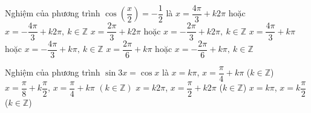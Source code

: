 \begin{ex}%
	Nghiệm của phương  trình $\cos \left(\dfrac{x}{2}\right)= -\dfrac{1}{2}$ là
	\choice 
		{\True $x=\dfrac{4\pi}{3}+k2\pi$ hoặc $x=-\dfrac{4\pi}{3} +  k2\pi, \ k\in \mathbb{Z}$}
		{$x=\dfrac{2\pi}{3}  + k2\pi$ hoặc $x=-\dfrac{2\pi}{3} + k2\pi, \ k\in \mathbb{Z}$}
		{$x=\dfrac{4\pi}{3} + k\pi$ hoặc $x=-\dfrac{4\pi}{3} + k\pi, \ k\in \mathbb{Z}$} 
		{$x=\dfrac{2\pi}{6} + k\pi$ hoặc $x=-\dfrac{2\pi}{6} + k\pi, \ k\in  \mathbb{Z}$}
\end{ex}

\begin{ex}%
	Nghiệm của phương trình $\sin 3x = \cos  x$ là
	 \choice
		{$x=k\pi$, $x=\dfrac{\pi}{4}+k\pi$  ($k\in\mathbb{Z}$)}
		{\True $x=\dfrac{\pi}{8}+k\dfrac{\pi}{2}$, $x=\dfrac{\pi}{4}+k\pi$  $(k\in\mathbb{Z})$}
		{$x=k2\pi$, $x=\dfrac{\pi}{2}+k2\pi$ ($k\in\mathbb{Z}$)} 
		{$x=k\pi$, $x=k\dfrac{\pi}{2}$  ($k\in\mathbb{Z}$)}
\end{ex}

